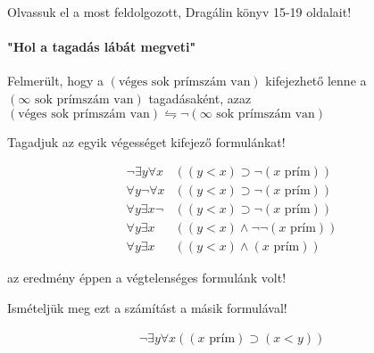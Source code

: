 \documentclass{article}
\begin{document}
Olvassuk el a most feldolgozott, Dragálin könyv 15-19 oldalait!

\paragraph{"Hol a tagadás lábát megveti"}

Felmerült, hogy a $(\text{véges sok prímszám van})$ kifejezhető lenne a $(\infty \text{ sok prímszám van})$ tagadásaként, azaz
$(\text{véges sok prímszám van}) \leftrightharpoons   \neg(\infty \text{ sok prímszám van})$ 

Tagadjuk az egyik végességet kifejező formulánkat!


 \begin{align*}
 \neg \exists y \forall x &((y<x) \supset \neg (x \text{ prím}))\\
 \forall y \neg\forall x &((y<x) \supset \neg (x \text{ prím}))\\
 \forall y \exists x \neg&((y<x) \supset \neg (x \text{ prím}))\\
 \forall y \exists x &((y<x) \wedge \neg\neg (x \text{ prím}))\\
 \forall y \exists x &((y<x) \wedge (x \text{ prím}))
 \end{align*} 
 
 az eredmény éppen a végtelenséges formulánk volt!
 
 Ismételjük meg ezt a számítást a másik formulával!




 \begin{align*}
 \neg \exists y \forall x ((x \text{ prím}) \supset (x<y))\\
 \end{align*} 
\end{document}
